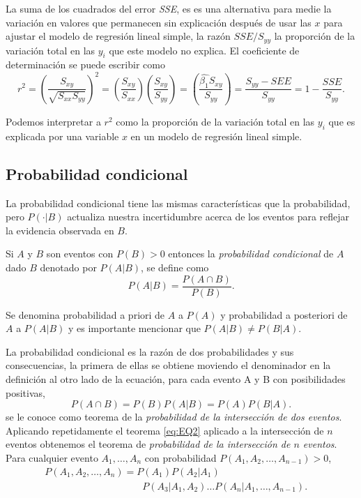 \documentclass[letterpaper]{article}
\begin{document}
La suma de los cuadrados del error \emph{SSE}, es es una alternativa para medie la variación en valores que permanecen sin explicación después de usar las $x$ para ajustar el modelo de regresión lineal simple, la razón $SSE/S_{yy}$ la proporción de la variación total en las $y_i$ que este modelo no explica. El coeficiente de determinación se puede escribir como
\begin{equation}
r^2=(\frac{S_{xy}}{\sqrt{S_{xx}S_{yy}}})^2=(\frac{S_{xy}}{S_{xx}})(\frac{S_{xy}}{S_{yy}})=(\frac{\hat{\beta_1}S_{xy}}{S_{yy}})=\frac{S_{yy}-SEE}{S_{yy}}=1-\frac{SSE}{S_{yy}}.
\end{equation}



Podemos interpretar a $r^2$ como la proporción de la variación total en las $y_i$  que es explicada por una variable $x$ en un modelo de regresión lineal simple.

\subsection {Probabilidad condicional}
La probabilidad condicional tiene las mismas características que la probabilidad, pero $P(\cdot|B)$ actualiza nuestra incertidumbre acerca de los eventos para reflejar la evidencia observada en $B$.

Si $A$ y $B$ son eventos con $P(B)>0$ entonces la \emph{probabilidad condicional} de $A$ dado $B$ denotado por $P(A|B)$, se define como
\begin{equation}
P(A|B)=\frac{P(A\cap B)}{P(B)}.
\end{equation}

Se denomina probabilidad a priori de $A$ a $P(A)$ y probabilidad a posteriori de $A$ a $P(A|B)$ y es importante mencionar que $P(A|B) \neq P(B|A)$.

La probabilidad condicional es la razón de dos probabilidades y sus consecuencias, la primera de ellas se obtiene moviendo el denominador en la definición al otro lado de la ecuación, para cada evento {A} y {B} con posibilidades positivas,
\begin{equation}\label{eq:EQ2}
P(A\cap B)=P(B)P(A|B)=P(A)P(B|A).
\end{equation}
se le conoce como teorema de la \emph{probabilidad de la intersección de dos eventos}. Aplicando repetidamente el teorema \eqref{eq:EQ2} aplicado a la intersección de $n$ eventos obtenemos el teorema de \emph{probabilidad de la intersección de $n$ eventos}. Para cualquier evento $A_1,\ldots,A_n$ con probabilidad $P(A_1,A_2,\ldots,A_{n-1})>0$,
\begin{equation}
\begin{matrix}
P(A_1,A_2,\ldots,A_n)=P(A_1)P(A_2|A_1) \qquad \qquad \qquad \qquad \qquad \\
\qquad  \qquad \qquad \qquad \qquad P(A_3|A_1,A_2)\ldots P(A_n|A_1,\ldots,A_{n-1}).\end{matrix}
\end{equation}
\end{document}
